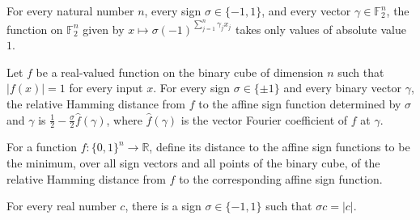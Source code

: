 \begin{theorem}
\label{FABL.isSignValued_affineSignFunction}
\leanok
{}
For every natural number $n$, every sign $\sigma\in\{−1,1\}$, and every vector
$\gamma\in\mathbb F_2^n$, the function on $\mathbb F_2^n$ given by
$x\mapsto\sigma(-1)^{\sum_{j=1}^n\gamma_jx_j}$ takes only values of absolute value
$1$.
\end{theorem}

\begin{theorem}
\label{FABL.relativeHammingDist_affineSignFunction}
\leanok
{}
Let $f$ be a real-valued function on the binary cube of dimension $n$ such that
$|f(x)|=1$ for every input $x$. For every sign $\sigma\in\{\pm1\}$ and every binary
vector $\gamma$, the relative Hamming distance from $f$ to the affine sign function
determined by $\sigma$ and $\gamma$ is $\frac12-\frac{\sigma}{2}\widehat f(\gamma)$,
where $\widehat f(\gamma)$ is the vector Fourier coefficient of $f$ at $\gamma$.
\end{theorem}

\begin{definition}
\label{FABL.distanceToAffineSigns}
\leanok
{}
For a function $f:\{0,1\}^n\to\mathbb{R}$, define its distance to the affine sign
functions to be the minimum, over all sign vectors and all points of the binary cube, of
the relative Hamming distance from $f$ to the corresponding affine sign function.
\end{definition}

\begin{theorem}
\label{FABL.exists_signValue_mul_eq_abs}
\leanok
{}
For every real number $c$, there is a sign $\sigma\in\{-1,1\}$ such that $\sigma c=|c|$.
\end{theorem}

